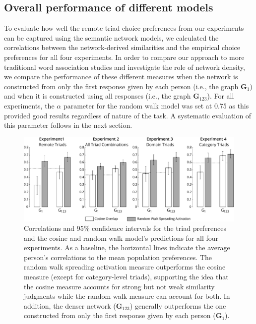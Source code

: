 \documentclass[doc]{apa6}
\begin{document}
\subsection{Overall performance of different models}

To evaluate how well the remote triad choice preferences from our experiments can be captured using the semantic network models, we calculated the correlations between the network-derived similarities and the empirical choice preferences for all four experiments. In order to compare our approach to more traditional word association studies and investigate the role of network density, we compare the performance of these different measures when the network is constructed from only the first response given by each person (i.e., the graph $\mathbf{G}_1$) and when it is constructed using all responses (i.e., the graph $\mathbf{G}_{123}$). For all experiments, the $\alpha$ parameter for the random walk model was set at 0.75 as this provided good results regardless of nature of the task. A systematic evaluation of this parameter follows in the next section.

\begin{figure}[ht]
\centering
\includegraphics[width=14.5cm]{images/summaryResults6.pdf}
\caption{\small{Correlations and 95\% confidence intervals for the triad preferences and the cosine and random walk model's predictions for all four experiments. As a baseline, the horizontal lines indicate the average person's correlations to the mean population preferences. The random walk spreading activation measure outperforms the cosine measure (except for category-level triads), supporting the idea that the cosine measure accounts for strong but not weak similarity judgments while the random walk measure can account for both. In addition, the denser network ($\mathbf{G}_{123}$) generally outperforms the one constructed from only the first response given by each person ($\mathbf{G}_1$).}}
\label{fig:networkcorrelations}
\end{figure}
\end{document}
